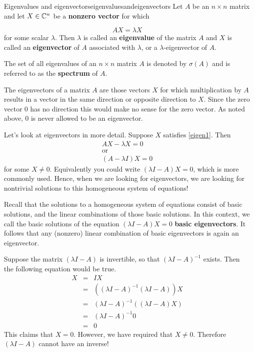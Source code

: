 \begin{definition}{Eigenvalues and eigenvectors}{eigenvaluesandeigenvectors}
Let $A$ be an $n\times n$ matrix and let $X \in \mathbb{C}^{n}$ be a
\textbf{nonzero vector} for which

\begin{equation}
AX=\lambda X  \label{eigen1}
\end{equation}
for some scalar $\lambda .$ Then $\lambda $ is called an
\textbf{eigenvalue}
of the matrix $A$ and $X$ is called an \textbf{eigenvector} of $A$ associated with $\lambda$, or a $\lambda$-eigenvector of $A$. 
 
The set of all eigenvalues of an $n\times n$ matrix $A$ is denoted by 
$\sigma \left( A\right) $ and is referred to as the \textbf{spectrum} of $A.$
\end{definition}

The eigenvectors of a matrix $A$ are those vectors $X$ for which
multiplication by $A$ results in a vector in the same direction or opposite
direction to $X$. Since the zero vector $0$ has no
direction this would make no sense for the zero vector. As noted above, 
$0$ is never allowed to be an eigenvector. 

Let's look at eigenvectors in more detail. Suppose $X$ satisfies \ref{eigen1}. Then
\begin{equation*}
\begin{array}{c}
AX - \lambda X = 0 \\
\mbox{or} \\
\left( A-\lambda I\right) X = 0
\end{array}
\end{equation*}
for some $X \neq 0.$ Equivalently you could write $\left( \lambda
I-A\right)X = 0$, which is more commonly used.  Hence, when we are looking for eigenvectors, we are
looking for nontrivial solutions to this homogeneous system of equations!

Recall that the solutions to a homogeneous system of equations consist
of basic solutions, and the linear combinations of those basic
solutions. In this context, we call the basic solutions of the
equation $\left( \lambda I - A\right) X = 0$ \textbf{basic
eigenvectors}. It follows that any (nonzero) linear combination of basic
eigenvectors is again an eigenvector.

Suppose the matrix $\left(\lambda I - A\right)$ is invertible, so that
$\left(\lambda I - A\right)^{-1}$ exists.
Then the following equation would be true.
\begin{eqnarray*}
X &=& IX \\
&=& \left( \left( \lambda I - A\right) ^{-1}\left(\lambda I - A \right)
\right) X \\
&=&\left( \lambda I - A\right) ^{-1}\left( \left( \lambda
I - A\right) X\right) \\
&=& \left( \lambda I - A\right) ^{-1}0 \\
&=& 0
\end{eqnarray*}
This claims that $X=0$. However, we have required that $ X \neq 0$. Therefore  $\left(\lambda I - A\right)$
cannot have an inverse! 


